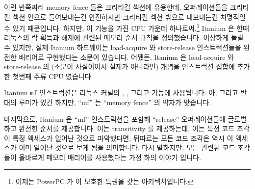 이런 반쪽짜리 memory fence 들은 크리티컬 섹션에 유용한데, 오퍼레이션들을
크리티컬 섹션 안으로 들여보내는건 안전하지만 크리티컬 섹션 밖으로 내보내는건
치명적일 수 있기 때문입니다.
하지만, 이 기능을 가진 CPU 가운데 하나로써,\footnote{
	이제는 PowerPC 가 이 모호한 특권을 갖는 아키텍쳐입니다.}
Itanium 은 한때 리눅스의 락 획득과 해제에 관련된 메모리 순서 규칙을
정의했습니다.
이상하게 들릴 수 있지만, 실제 Itanium 하드웨어는 load-acquire 와 store-release
인스트럭션들을 완전한 배리어로 구현했다는 소문이 있습니다.
어쨌든, Itanium 은 load-acquire 와 store-release 의 (소문이 사실이어서 실제가
아니라면) 개념을 인스트럭션 집합에 추가한 첫번째 주류 CPU 였습니다.

Itanium {\tt mf} 인스트럭션은 리눅스 커널의 , ,
그리고  기능에 사용됩니다.
아, 그리고 반대의 루머가 있긴 하지만, ``mf'' 는 ``memory fence'' 의 약자가
맞습니다.

마지막으로, Itanium 은 ``mf'' 인스트럭션을 포함해 ``release'' 오퍼레이션들에
글로벌하고 완전한 순서를 제공합니다.
이는 transitivity 를 제공하는데, 이는 특정 코드 조각이 특정 액세스가 일어난
것으로 파악했다면, 뒤따르는 모든 코드 조각은 역시 이 액세스가 이미 일어난
것으로 보게 됨을 의미합니다.
다시 말하지만, 모든 관련된 코드 조각들이 올바르게 메모리 배리어를 사용했다는
가정 하의 이야기 입니다.

